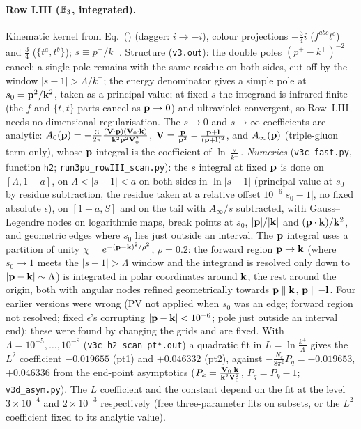 \paragraph{Row I.III ($\mathbb{B}_3$, integrated).} Kinematic kernel from Eq.~() (dagger: $i\to-i$), colour projections $-\frac{3}{4}i$ ($f^{abc}t^c$) and $\frac34$ ($\{t^a,t^b\}$); $s\equiv p^+/k^+$. Structure (\texttt{v3.out}): the double poles $(p^+-k^+)^{-2}$ cancel; a single pole remains with the same residue on both sides, cut off by the window $|s-1|>\Lambda/k^+$; the energy denominator gives a simple pole at $s_0=\mathbf{p}^2/\mathbf{k}^2$, taken as a principal value; at fixed $s$ the integrand is infrared finite (the $f$ and $\{t,t\}$ parts cancel as $\mathbf{p}\to0$) and ultraviolet convergent, so Row~I.III needs no dimensional regularisation. The $s\to0$ and $s\to\infty$ coefficients are analytic: $A_0(\mathbf{p})=-\frac{3}{2\pi}\frac{(\mathbf{V}\cdot\mathbf{p})(\mathbf{V}_0\cdot\mathbf{k})}{\mathbf{k}^2\mathbf{p}^2\mathbf{V}_0^2}$, $\mathbf{V}=\frac{\mathbf{p}}{\mathbf{p}^2}-\frac{\mathbf{p}+\mathbf{l}}{(\mathbf{p}+\mathbf{l})^2}$, and $A_\infty(\mathbf{p})$ (triple-gluon term only), whose $\mathbf{p}$ integral is the coefficient of $\ln\frac{\vee}{k^+}$. \emph{Numerics} (\texttt{v3c\_fast.py}, function \texttt{h2}; \texttt{run3pu\_rowIII\_scan.py}): the $s$ integral at fixed $\mathbf{p}$ is done on $[\Lambda,1-a]$, on $\Lambda<|s-1|<a$ on both sides in $\ln|s-1|$ (principal value at $s_0$ by residue subtraction, the residue taken at a relative offset $10^{-6}|s_0-1|$, no fixed absolute $\epsilon$), on $[1+a,S]$ and on the tail with $A_\infty/s$ subtracted, with Gauss--Legendre nodes on logarithmic maps, break points at $s_0$, $|\mathbf{p}|/|\mathbf{k}|$ and $(\mathbf{p}\cdot\mathbf{k})/\mathbf{k}^2$, and geometric edges where $s_0$ lies just outside an interval. The $\mathbf{p}$ integral uses a partition of unity $\chi=e^{-(\mathbf{p}-\mathbf{k})^2/\rho^2}$, $\rho=0.2$: the forward region $\mathbf{p}\to\mathbf{k}$ (where $s_0\to1$ meets the $|s-1|>\Lambda$ window and the integrand is resolved only down to $|\mathbf{p}-\mathbf{k}|\sim\Lambda$) is integrated in polar coordinates around $\mathbf{k}$, the rest around the origin, both with angular nodes refined geometrically towards $\mathbf{p}\parallel\mathbf{k}$, $\mathbf{p}\parallel-\mathbf{l}$. Four earlier versions were wrong (PV not applied when $s_0$ was an edge; forward region not resolved; fixed $\epsilon$'s corrupting $|\mathbf{p}-\mathbf{k}|<10^{-6}$; pole just outside an interval end); these were found by changing the grids and are fixed. With $\Lambda=10^{-5},\dots,10^{-8}$ (\texttt{v3c\_h2\_scan\_pt*.out}) a quadratic fit in $L=\ln\frac{k^+}{\Lambda}$ gives the $L^2$ coefficient $-0.019655$ (pt1) and $+0.046332$ (pt2), against $-\frac{N_c}{8\pi^2}P_q=-0.019653$, $+0.046336$ from the end-point asymptotics ($P_k=\frac{\mathbf{V}_0\cdot\mathbf{k}}{\mathbf{k}^2\mathbf{V}_0^2}$, $P_q=P_k-1$; \texttt{v3d\_asym.py}). The $L$ coefficient and the constant depend on the fit at the level $3\times10^{-4}$ and $2\times10^{-3}$ respectively (free three-parameter fits on subsets, or the $L^2$ coefficient fixed to its analytic value).

